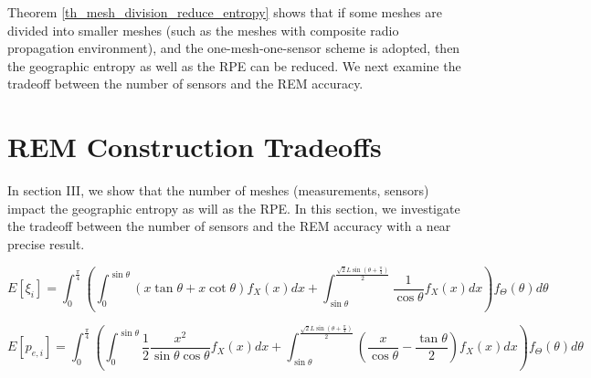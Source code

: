 \documentclass[conference]{IEEEtran}
\begin{document}
Theorem \ref{th_mesh_division_reduce_entropy} shows that if some meshes are divided into smaller meshes
(such as the meshes with composite radio propagation environment), and
the one-mesh-one-sensor scheme is adopted, then the geographic entropy as well as the RPE can be reduced.
We next examine the tradeoff between the number of sensors and the REM accuracy.

\section{REM Construction Tradeoffs}

In section III, we show that the number of meshes (measurements, sensors) impact the geographic entropy as will as the RPE. In this section, we investigate the tradeoff between the number of sensors and the REM accuracy with a near precise result.

\begin{figure*}[ht]
\normalsize

\begin{equation}\label{eq_expectation_of_length_in_mesh}
E[{\xi _i}] = \int_0^{\frac{\pi }{4}} {\left( {\int_0^{\sin \theta } {\left( {x\tan \theta  + x\cot \theta } \right){f_X}(x)dx}  + \int_{\sin \theta }^{\frac{{\sqrt 2 L\sin \left( {\theta  + \frac{\pi }{4}} \right)}}{2}} {\frac{1}{{\cos \theta }}{f_X}(x)dx} } \right){f_\Theta }(\theta )d\theta }
\end{equation}

\begin{equation}\label{eq_expectation_of_RPE}
E[{p_{e,i}}] = \int_0^{\frac{\pi }{4}} {\left( {\int_0^{\sin \theta } {\frac{1}{2}\frac{{{x^2}}}{{\sin \theta \cos \theta }}{f_X}(x)dx}  + \int_{\sin \theta }^{\frac{{\sqrt 2 L\sin \left( {\theta  + \frac{\pi }{4}} \right)}}{2}} {\left( {\frac{x}{{\cos \theta }} - \frac{{\tan \theta }}{2}} \right){f_X}(x)dx} } \right){f_\Theta }(\theta )d\theta }
\end{equation}
\hrulefill \vspace*{4pt}
\end{figure*}
\end{document}
